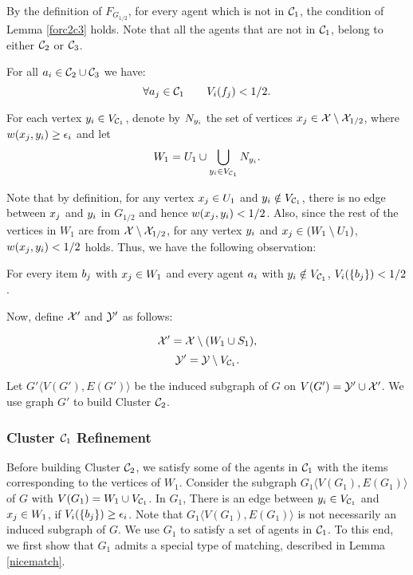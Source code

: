 By the definition of $F_{G_{1/2}}$, for every agent which is not in $\mathcal{C}_1$, the condition of Lemma \ref{forc2c3} holds. Note that all the agents that are not in $\mathcal{C}_1$, belong to either $\mathcal{C}_2$ or $\mathcal{C}_3$.


\begin{lemma}
\label{forc2c3}
For all $a_i \in \mathcal{C}_2 \cup \mathcal{C}_3$ we have: \[ \forall a_j \in \mathcal{C}_1 \qquad V_i(f_j) < 1/2. \]
\end{lemma}

For each vertex $y_i \in V_{\mathcal{C}_1}$, denote by $N_{y_i}$ the set of vertices $x_j  \in \mathcal{X} \setminus \mathcal{X}_{1/2}$, where $w(x_j,y_i) \geq \epsilon_i$ and let \[W_1 = U_1 \cup \bigcup_{y_i \in V_{\mathcal{C}_1}} N_{y_i}.\]

Note that by definition, for any vertex $x_j \in U_1$ and $y_i \notin V_{\mathcal{C}_1}$, there is no edge between $x_j$ and $y_i$ in $G_{1/2}$ and hence $w(x_j,y_i)<1/2$. Also, since the rest of the vertices in $W_1$ are from $\mathcal{X} \setminus \mathcal{X}_{1/2}$, for any vertex $y_i$ and $x_j \in (W_1 \setminus U_1)$, $w(x_j,y_i)<1/2$ holds. Thus, we have the following observation:

\begin{observation}
\label{w1small}
For every item $b_j$ with $x_j \in W_1$ and every agent $a_i$ with $y_i \notin V_{\mathcal{C}_1}$, $V_i(\{b_j\})<1/2$.
\end{observation}

Now, define $\mathcal{X}'$ and $ \mathcal{Y}' $ as follows:

$$\mathcal{X}' = \mathcal{X} \setminus (W_1 \cup S_1),$$ $$\mathcal{Y}' = \mathcal{Y} \setminus V_{\mathcal{C}_1}.$$ 

Let $G'\langle V(G'),E(G')\rangle $ be the induced subgraph of $G$ on $V(G') = \mathcal{Y}' \cup \mathcal{X}'$. We use graph $G'$ to build Cluster $\mathcal{C}_2$. 



\subsubsection{Cluster $\mathcal{C}_1$ Refinement} Before building Cluster $\mathcal{C}_2$, we satisfy some of the agents in $\mathcal{C}_1$ with the items corresponding to the vertices of $W_1$. Consider the subgraph $G_1 \langle V(G_1),E(G_1) \rangle$ of $G$ with $V(G_1) = W_1 \cup V_{\mathcal{C}_1}$. In $G_1$, There is an edge between $y_i \in V_{\mathcal{C}_1}$ and $x_j \in W_1$, if $V_i(\{b_j\}) \geq \epsilon_i$. Note that $G_1 \langle V(G_1),E(G_1) \rangle$ is not necessarily an induced subgraph of $G$. We use $G_1$ to satisfy a set of agents in $\mathcal{C}_1$. To this end, we first show that $G_1$ admits a special type of matching, described in Lemma \ref{nicematch}.


